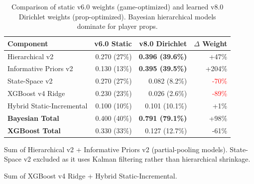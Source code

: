 \begin{table}[htbp]
\centering
\caption[v6.0 vs v8.0 Dirichlet weight comparison]{Comparison of static v6.0 weights (game-optimized) and learned v8.0 Dirichlet weights (prop-optimized). Bayesian hierarchical models dominate for player props.}
\label{tab:weight-comparison}
\begin{threeparttable}
\begin{tabular}{@{}lrrr@{}}
\toprule
\textbf{Component} & \textbf{v6.0 Static} & \textbf{v8.0 Dirichlet} & \textbf{$\Delta$ Weight} \\
\midrule
Hierarchical v2 & 0.270 (27\%) & \textbf{0.396 (39.6\%)} & +47\% \\
Informative Priors v2 & 0.130 (13\%) & \textbf{0.395 (39.5\%)} & +204\% \\
State-Space v2 & 0.270 (27\%) & 0.082 (8.2\%) & \textcolor{red}{-70\%} \\
XGBoost v4 Ridge & 0.230 (23\%) & 0.026 (2.6\%) & \textcolor{red}{-89\%} \\
Hybrid Static-Incremental & 0.100 (10\%) & 0.101 (10.1\%) & +1\% \\
\midrule
\textbf{Bayesian Total}\tnote{a} & 0.400 (40\%) & \textbf{0.791 (79.1\%)} & +98\% \\
\textbf{XGBoost Total}\tnote{b} & 0.330 (33\%) & 0.127 (12.7\%) & -61\% \\
\bottomrule
\end{tabular}
\begin{tablenotes}
\footnotesize
\item[a] Sum of Hierarchical v2 + Informative Priors v2 (partial-pooling models). State-Space v2 excluded as it uses Kalman filtering rather than hierarchical shrinkage.
\item[b] Sum of XGBoost v4 Ridge + Hybrid Static-Incremental.
\end{tablenotes}
\end{threeparttable}
\end{table}

